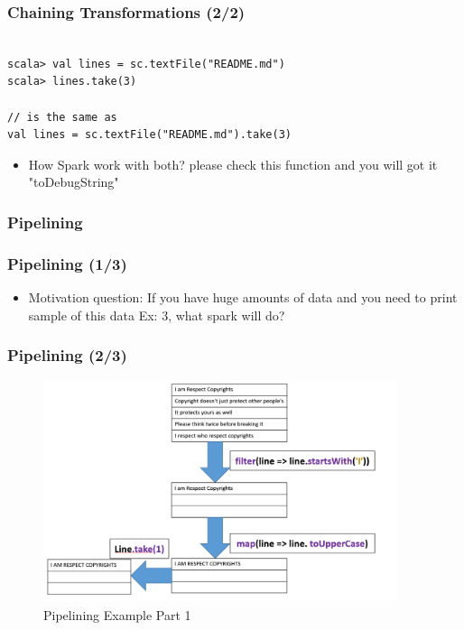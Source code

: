 \begin{frame}[fragile]
	  \frametitle{Chaining Transformations (2/2)}

			\begin{lstlisting}[style=myScalastyle, caption=Chaining Transformations Execution Example]

scala> val lines = sc.textFile("README.md")
scala> lines.take(3)
				
// is the same as 
val lines = sc.textFile("README.md").take(3)
			\end{lstlisting}
\begin{itemize}[<+->]

\item How Spark work with both? please check this function and you will got it "toDebugString"
\end{itemize}
\end{frame}

%
%
%

\subsubsection{Pipelining}
\begin{frame}
	  \frametitle{Pipelining (1/3)}
		\begin{itemize}[<+->]
			\item Motivation question: If you have huge amounts of data and you need to print sample of this data Ex: 3, what spark will do?
		\end{itemize}
\end{frame}

\begin{frame}
	  \frametitle{Pipelining (2/3)}
	    \begin{figure}
	  	\caption{Pipelining Example Part 1}  		  	
			\includegraphics[width=\textwidth,height=6.5cm]{Graphics/take1pipe.PNG}
		\end{figure}
\end{frame}

